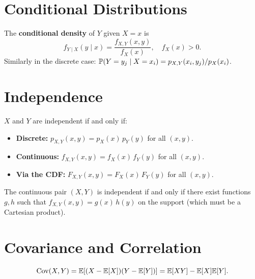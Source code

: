 \section{Conditional Distributions}

\begin{definition}
The \textbf{conditional density} of $Y$ given $X = x$ is
\[
    f_{Y \mid X}(y \mid x) = \frac{f_{X,Y}(x, y)}{f_X(x)}, \quad f_X(x) > 0.
\]
Similarly in the discrete case:
$\mathbb{P}(Y = y_j \mid X = x_i) = p_{X,Y}(x_i, y_j)/p_X(x_i)$.
\end{definition}

\section{Independence}

\begin{theorem}
$X$ and $Y$ are independent if and only if:
\begin{itemize}
    \item \textbf{Discrete:} $p_{X,Y}(x,y) = p_X(x)\,p_Y(y)$ for all $(x,y)$.
    \item \textbf{Continuous:} $f_{X,Y}(x,y) = f_X(x)\,f_Y(y)$ for all $(x,y)$.
    \item \textbf{Via the CDF:} $F_{X,Y}(x,y) = F_X(x)\,F_Y(y)$ for all $(x,y)$.
\end{itemize}
\end{theorem}

\begin{proposition}
The continuous pair $(X,Y)$ is independent if and only if there exist functions
$g, h$ such that $f_{X,Y}(x,y) = g(x)\,h(y)$ on the support (which must be a
Cartesian product).
\end{proposition}

\section{Covariance and Correlation}

\begin{definition}[Covariance]
\[
    \mathrm{Cov}(X, Y) = \mathbb{E}[(X - \mathbb{E}[X])(Y - \mathbb{E}[Y])] = \mathbb{E}[XY] - \mathbb{E}[X]\mathbb{E}[Y].
\]
\end{definition}

